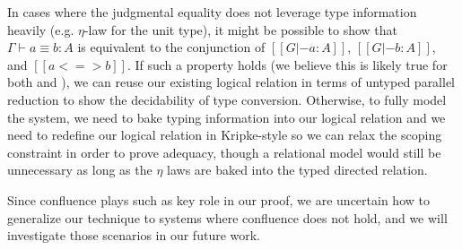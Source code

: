 \documentclass[acmsmall,screen=true,
\ifpublic review=false\else,review=true\fi
  ,anonymous=\ifanonymous true\else false\fi]{acmart}
\newcommand{\lang}{$\lambda^H$\xspace}
\newcommand{\scw}[1]{}
\begin{document}
In cases where the judgmental equality does not leverage type information heavily
(e.g. $\eta$-law for the unit type), it might be possible to show that
$\Gamma \vdash a \equiv b : A$ is equivalent to the conjunction of
$[[G |- a : A]]$, $[[G |- b : A ]]$, and $[[a <=> b]]$. If such a
property holds (we believe this is likely true for both
\citet{decagda} and \citet{martin-lof-a-la-coq}), we can reuse our existing logical relation in
terms of untyped parallel reduction to show the decidability of type
conversion. Otherwise, to fully model the system, we need to bake
typing information into our logical relation and we need to redefine
our logical relation in Kripke-style so we can relax the scoping
constraint in order to prove adequacy, though a relational model would
still be unnecessary as long as the $\eta$ laws are baked into the
typed directed relation. \scw{not sure I understand this last bit}

Since confluence plays such as key role in our proof, we are uncertain
how to generalize our technique to systems where confluence does not
hold, and we will investigate those scenarios in our future work.
\scw{What systems are you thinking of? Or do you mean more generally
that this technique only works for languages where the definition of
equality is based on joinability of parallel reduction?}




\end{document}

